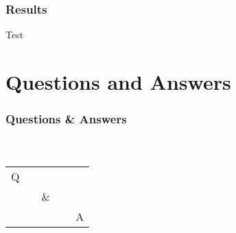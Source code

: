 \documentclass{beamer}
\begin{document}
\begin{frame}
\frametitle{Results}

Test

\end{frame}










\section{Questions and Answers}

\begin{frame}
	\frametitle<presentation>{Questions \& Answers}
	\framesubtitle{~}
	\begin{center}
		\fontsize{64}{64}\selectfont
		\begin{tabular}{ccc}
			Q &&\\
			& ~~\& & \\
			&&~~ A
		\end{tabular}
	\end{center}
\end{frame}
\end{document}
